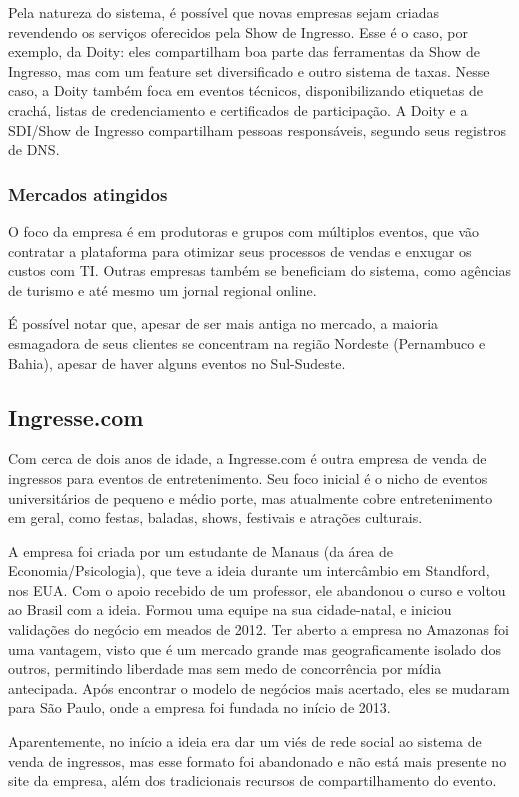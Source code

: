 \documentclass[12pt,a4paper,twoside,hyphens,english,brazil]{abntex2}
\begin{document}
Pela natureza do sistema, é possível que novas empresas sejam criadas revendendo os serviços oferecidos pela Show de Ingresso. Esse é o caso, por exemplo, da Doity: eles compartilham boa parte das ferramentas da Show de Ingresso, mas com um feature set diversificado e outro sistema de taxas. Nesse caso, a Doity também foca em eventos técnicos, disponibilizando etiquetas de crachá, listas de credenciamento e certificados de participação. A Doity e a SDI/Show de Ingresso compartilham pessoas responsáveis, segundo seus registros de DNS.

\subsubsection*{Mercados atingidos}
O foco da empresa é em produtoras e grupos com múltiplos eventos, que vão contratar a plataforma para otimizar seus processos de vendas e enxugar os custos com TI. Outras empresas também se beneficiam do sistema, como agências de turismo e até mesmo um jornal regional online.

É possível notar que, apesar de ser mais antiga no mercado, a maioria esmagadora de seus clientes se concentram na região Nordeste (Pernambuco e Bahia), apesar de haver alguns eventos no Sul-Sudeste.

\subsection{Ingresse.com}
Com cerca de dois anos de idade, a Ingresse.com é outra empresa de venda de ingressos para eventos de entretenimento. Seu foco inicial é o nicho de eventos universitários de pequeno e médio porte, mas atualmente cobre entretenimento em geral, como festas, baladas, shows, festivais e atrações culturais.

A empresa foi criada por um estudante de Manaus (da área de Economia/Psicologia), que teve a ideia durante um intercâmbio em Standford, nos EUA. Com o apoio recebido de um professor, ele abandonou o curso e voltou ao Brasil com a ideia. Formou uma equipe na sua cidade-natal, e iniciou validações do negócio em meados de 2012. Ter aberto a empresa no Amazonas foi uma vantagem, visto que é um mercado grande mas geograficamente isolado dos outros, permitindo liberdade mas sem medo de concorrência por mídia antecipada. Após encontrar o modelo de negócios mais acertado, eles se mudaram para São Paulo, onde a empresa foi fundada no início de 2013.\cite{ingresse-hypeness}\cite{ingresse-ig}

Aparentemente, no início a ideia era dar um viés de rede social ao sistema de venda de ingressos, mas esse formato foi abandonado e não está mais presente no site da empresa, além dos tradicionais recursos de compartilhamento do evento.\cite{ingresse-ig}
\end{document}
